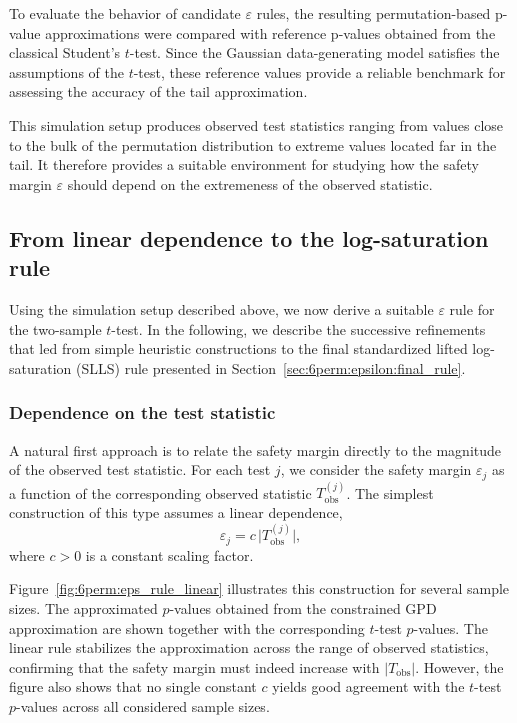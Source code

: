 To evaluate the behavior of candidate $\varepsilon$ rules, the resulting permutation-based p-value approximations were compared with reference p-values obtained from the classical Student's $t$-test. Since the Gaussian data-generating model satisfies the assumptions of the $t$-test, these reference values provide a reliable benchmark for assessing the accuracy of the tail approximation.

This simulation setup produces observed test statistics ranging from values close to the bulk of the permutation distribution to extreme values located far in the tail. 
It therefore provides a suitable environment for studying how the safety margin $\varepsilon$ should depend on the extremeness of the observed statistic.

\subsection{From linear dependence to the log-saturation rule}
\label{sec:6perm:epsilon:log_saturation}

Using the simulation setup described above, we now derive a suitable $\varepsilon$ rule for the two-sample $t$-test. In the following, we describe the successive refinements that led from simple heuristic constructions to the final standardized lifted log-saturation (SLLS) rule presented in Section~\ref{sec:6perm:epsilon:final_rule}.

\subsubsection*{Dependence on the test statistic} 

A natural first approach is to relate the safety margin directly to the magnitude of the observed test statistic. 
For each test $j$, we consider the safety margin $\varepsilon_j$ as a function of the corresponding observed statistic $T_{\mathrm{obs}}^{(j)}$. 
The simplest construction of this type assumes a linear dependence,
\begin{equation}
\varepsilon_j = c\,\big|T_{\mathrm{obs}}^{(j)}\big|,
\end{equation}
where $c>0$ is a constant scaling factor.

Figure~\ref{fig:6perm:eps_rule_linear} illustrates this construction for several sample sizes. 
The approximated $p$-values obtained from the constrained GPD approximation are shown together with the corresponding $t$-test $p$-values. 
The linear rule stabilizes the approximation across the range of observed statistics, confirming that the safety margin must indeed increase with $|T_{\mathrm{obs}}|$. 
However, the figure also shows that no single constant $c$ yields good agreement with the $t$-test $p$-values across all considered sample sizes. 

